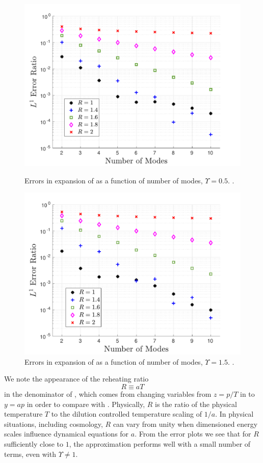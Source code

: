 \begin{figure}
\centerline{\includegraphics[width=0.8\linewidth]{06-appendix/SpectralMethodBoltzmann/Figures/free_stream_f0_approx_Ups_5.pdf}}
\caption{Errors in expansion of  as a function of number of modes, $\Upsilon=0.5$. .}\label{fig:freeStreamf0approxUps5}
 \centerline{\includegraphics[width=0.8\linewidth]{06-appendix/SpectralMethodBoltzmann/Figures/free_stream_f0_approx_Ups_1_5.pdf}}
\caption{Errors in  expansion of  as a function of number of modes, $\Upsilon=1.5$. .}\label{fig:freeStreamf0approxUps15}
\end{figure}


We note the appearance of the reheating ratio
\begin{equation}\label{reheat}
 R\equiv aT  
\end{equation}
in the denominator of , which comes from changing variables from $z=p/T$ in  to $y=ap$ in order to compare with .  Physically, $R$ is the ratio of the physical temperature $T$ to the dilution controlled temperature scaling  of $1/a$.   In physical situations, including cosmology, $R$ can vary from unity when dimensioned energy scales influence dynamical equations for $a$. From the error plots we see that for $R$ sufficiently close to $1$, the approximation performs well with a small number of terms, even with $\Upsilon\neq 1$.  




